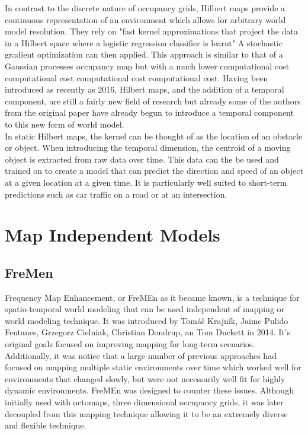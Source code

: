 In contrast to the discrete nature of occupancy grids, Hilbert maps provide a
continuous representation of an environment which allows for arbitrary world
model resolution. They rely on "fast kernel approximations that project the
data in a Hilbert space where a logistic regression classifier is learnt"
A stochastic gradient optimization can then applied. This approach is similar to
that of a Gaussian processes occupancy map but with a much lower computational
cost computational cost computational cost computational cost. Having been
introduced as recently as 2016, Hilbert maps, and the addition of a temporal
component, are still a fairly new field of research but already some of the
authors from the original paper have already begun to introduce a temporal
component to this new form of world model. \cite{Ramos2016, Senanayake2016} \\

In static Hilbert maps, the kernel can be thought of as the location of an
obstacle or object. When introducing the temporal dimension, the centroid of a
moving object is extracted from raw data over time. This data can the be used
and trained on to create a model that can predict the direction and speed of an
object at a given location at a given time. It is particularly well suited to
short-term predictions such as car traffic on a road or at an intersection.
\cite{Senanayake2016} \cite{Senanayake2017}

\section{ Map Independent Models }

\subsection{ FreMen }

Frequency Map Enhancement, or FreMEn as it became known, is a technique for
spatio-temporal world modeling that can be used independent of mapping or
world modeling technique. It was introduced by Tomáš Krajník, Jaime Pulido
Fentanes, Grzegorz Cielniak, Christian Dondrup, an Tom Duckett in 2014. It's
original goals focused on improving mapping for long-term scenarios.
Additionally, it was notice that a large number of previous approaches had
focused on mapping multiple static environments over time which worked well
for environments that changed slowly, but were not necessarily well fit for
highly dynamic environments. FreMEn was designed to counter these issues.
\cite{Fentanes2014} Although initially used with octomaps, three dimensional
occupancy grids, it was later decoupled from this mapping technique allowing
it to be an extremely diverse and flexible technique. \\

